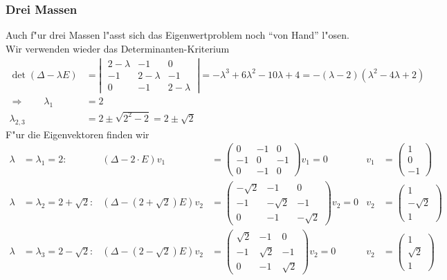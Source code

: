 \subsubsection{Drei Massen}
Auch f"ur drei Massen l"asst sich das Eigenwertproblem noch
``von Hand'' l"osen.
Wir verwenden wieder das Determinanten-Kriterium
\begin{align*}
\det(\Delta -\lambda E)&=\left|\;
\begin{matrix}
2-\lambda&-1&0\\
-1&2-\lambda&-1\\
0&-1&2-\lambda
\end{matrix}
\;\right|
=-\lambda^3+6\lambda^2-10\lambda+4=-(\lambda-2)(\lambda^2-4\lambda+2)
\\
\Rightarrow\qquad
\lambda_1&=2\\
\lambda_{2,3}&=2\pm\sqrt{2^2-2}=2\pm\sqrt{2}
\end{align*}
F"ur die Eigenvektoren finden wir
\begin{align*}
\lambda&=\lambda_1=2:
&
(\Delta - 2\cdot E)v_1&=\begin{pmatrix}
0&-1&0\\
-1&0&-1\\
0&-1&0\end{pmatrix}v_1
=0&v_1&=\begin{pmatrix}1\\0\\-1\end{pmatrix}
\\
\lambda&=\lambda_2=2+\sqrt{2}:
&
(\Delta -(2+\sqrt{2})E)v_2&=\begin{pmatrix}
-\sqrt{2}&-1&0\\
-1&-\sqrt{2}&-1\\
0&-1&-\sqrt{2}
\end{pmatrix}v_2=0&
v_2&=\begin{pmatrix}
1\\-\sqrt{2}\\1
\end{pmatrix}
\\
\lambda&=\lambda_3=2-\sqrt{2}:
&
(\Delta -(2-\sqrt{2})E)v_2&=\begin{pmatrix}
\sqrt{2}&-1&0\\
-1&\sqrt{2}&-1\\
0&-1&\sqrt{2}
\end{pmatrix}v_2=0&
v_2&=\begin{pmatrix}
1\\\sqrt{2}\\1
\end{pmatrix}
\\
\end{align*}
